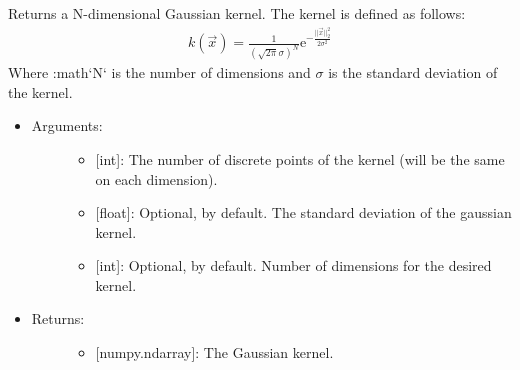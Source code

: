 \documentclass[letterpaper,10pt,english]{sphinxmanual}
\begin{document}

\begin{fulllineitems}
\label{\detokenize{signal:data_tools.signal.gauss_kernel}}
Returns a N-dimensional Gaussian kernel. The kernel is defined as
follows:
\begin{equation*}
\begin{split}k(\vec{x})=\frac{1}{(\sqrt{2\pi}\sigma)^N}\mathrm{e}^{-
\frac{||\vec{x}||_2^2}{2\sigma^2}}\end{split}
\end{equation*}
Where :math{}`N{}` is the number of dimensions and \(\sigma\) is
the standard deviation of the kernel.
\begin{itemize}
\item {} \begin{description}
\item[{Arguments:}] \leavevmode\begin{itemize}
\item {} 
 {[}int{]}: The number of discrete points of the kernel
(will be the same on each dimension).

\item {} 
 {[}float{]}: Optional,  by default. The standard
deviation of the gaussian kernel.

\item {} 
 {[}int{]}: Optional,  by default. Number of dimensions
for the desired kernel.

\end{itemize}

\end{description}

\item {} \begin{description}
\item[{Returns:}] \leavevmode\begin{itemize}
\item {} 
{[}numpy.ndarray{]}: The Gaussian kernel.

\end{itemize}

\end{description}

\end{itemize}

\end{fulllineitems}
\end{document}
